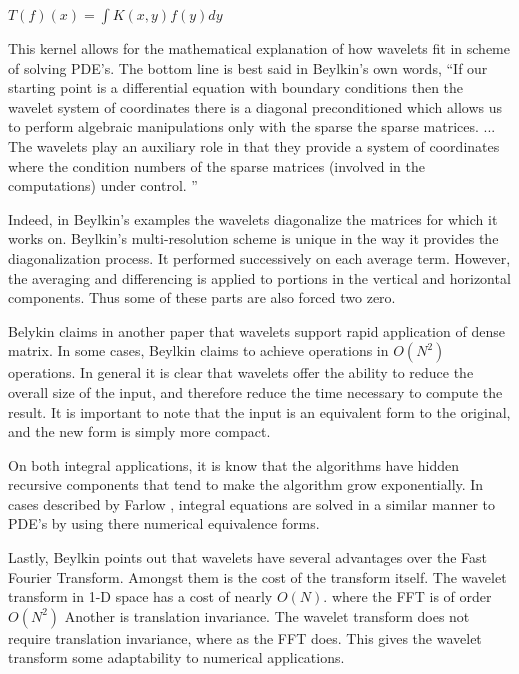 \documentclass[11pt]{article}
\begin{document}
$T(f)(x) = \int K(x,y) f(y)dy $

This kernel allows for the mathematical explanation of how wavelets fit in scheme of solving PDE's.  The bottom line is best said in Beylkin's own words, ``If our starting point is a differential equation with boundary conditions then the wavelet system of coordinates there is a diagonal preconditioned which allows us to perform algebraic manipulations only with the sparse the sparse matrices. ... The wavelets play an auxiliary role in that they provide a system of coordinates where the condition numbers of the sparse matrices (involved in the computations) under control.  ''

Indeed, in Beylkin's examples the wavelets diagonalize the matrices for which it works on.  Beylkin's multi-resolution scheme is unique in the way it provides the diagonalization process.  It performed successively on each average term.  However, the averaging and differencing is applied to portions in the vertical and horizontal components.  Thus some of these parts are also forced two zero. %


Belykin claims in another paper that wavelets support rapid application of dense matrix.  In some cases, Beylkin claims to achieve operations in $O(N^2)$ operations.  In general it is clear that wavelets offer the ability to reduce the overall size of the input, and therefore reduce the time necessary to compute the result.  It is important to note that the input is an equivalent form to the original, and the new form is simply more compact.  

On both integral applications, it is know that the algorithms have hidden recursive components that tend to make the algorithm grow exponentially.    In cases described by Farlow \cite{PDEfSE}, integral equations are solved in a similar manner to PDE's by using there numerical equivalence forms.  

Lastly, Beylkin points out that wavelets have several advantages over the Fast Fourier Transform.  Amongst them is the cost of the transform itself.  The wavelet transform in 1-D space has a cost of nearly $O (N)$. where the FFT is of order $O(N^2)$  Another is translation invariance.  The wavelet transform does not require translation invariance, where as the FFT does.  This gives the wavelet transform some adaptability to numerical applications.  
\end{document}
